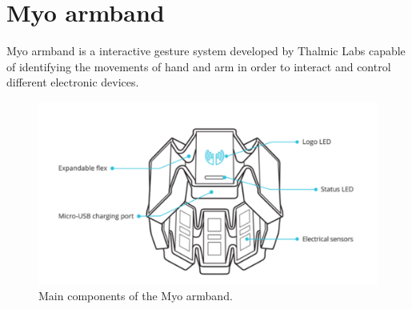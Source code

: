 \section{Myo armband}

Myo armband is a interactive gesture system developed by Thalmic Labs capable of identifying the movements of hand and arm in order to interact and control different electronic devices.

\begin{figure}[H]                    
	\includegraphics[width=.5\textwidth]{figures/myob/armband}  %
	\caption{Main components of the Myo armband. \cite{}}
	\label{fig:armband}  %
\end{figure}



